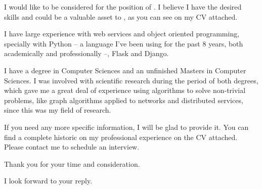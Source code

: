 \documentclass[10pt,stdletter,dateno,sigleft]{newlfm} %
\begin{document}
\begin{newlfm}


I would like to be considered for the position of \jobtitle. I believe I have the
desired skills and could be a valuable asset to \company, as you can see on my CV attached.

I have large experience with web services and object oriented programming, specially with Python -- a language I've
been using for the past 8 years, both academically and professionally --, Flask and Django.

I have a degree in Computer Sciences and an unfinished Masters in Computer Sciences. I was involved with scientific research
during the period of both degrees, which gave me a great deal of experience using algorithms to solve
non-trivial problems, like graph algorithms applied to networks and distributed services, since this was
my field of research.

If you need any more specific information, I will be glad to provide it. You can find a complete historic on my
professional experience on the CV attached. Please contact me to schedule an interview.

Thank you for your time and consideration.

I look forward to your reply.


\end{newlfm}
\end{document}
